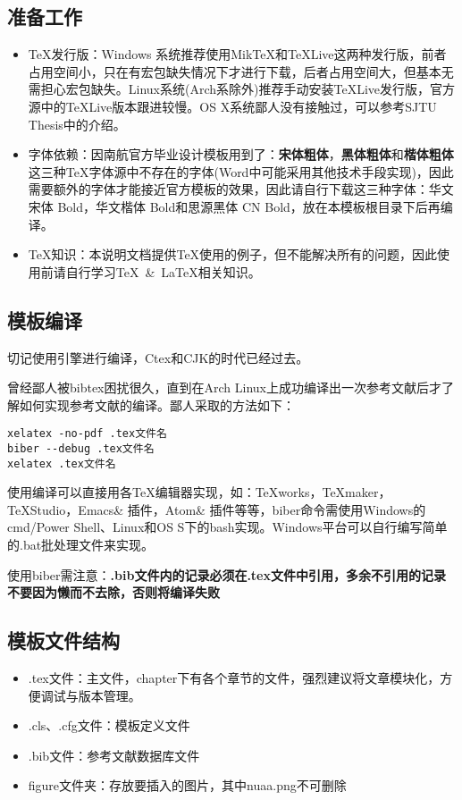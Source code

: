 \subsection{准备工作}
\begin{itemize}[noitemsep,topsep=0pt,parsep=0pt,partopsep=0pt]
  \item \TeX 发行版：Windows 系统推荐使用MikTeX和TeXLive这两种发行版，前者占用空间小，只在有宏包缺失情况下才进行下载，后者占用空间大，但基本无需担心宏包缺失。Linux系统(Arch系除外)推荐手动安装TeXLive发行版，官方源中的TeXLive版本跟进较慢。OS X系统鄙人没有接触过，可以参考SJTU Thesis中的介绍。
  \item 字体依赖：因南航官方毕业设计模板用到了：\textbf{宋体粗体}，\textbf{黑体粗体}和\textbf{楷体粗体}这三种\TeX 字体源中不存在的字体(Word中可能采用其他技术手段实现)，因此需要额外的字体才能接近官方模板的效果，因此请自行下载这三种字体：华文宋体 Bold，华文楷体 Bold和思源黑体 CN Bold，放在本模板根目录下后再编译。
  \item \TeX 知识：本说明文档提供\TeX 使用的例子，但不能解决所有的问题，因此使用前请自行学习\TeX~\&~\LaTeX 相关知识。
\end{itemize}

\subsection{模板编译}

切记使用\XeLaTeX 引擎进行编译，Ctex和CJK的时代已经过去。

曾经鄙人被bibtex困扰很久，直到在Arch Linux上成功编译出一次参考文献后才了解如何实现参考文献的编译。鄙人采取的方法如下：
\begin{lstlisting}[basicstyle=\small\ttfamily, caption={手动逐次编译}, numbers=none]
xelatex -no-pdf .tex文件名
biber --debug .tex文件名
xelatex .tex文件名
\end{lstlisting}

使用\XeLaTeX 编译可以直接用各\TeX 编辑器实现，如：TeXworks，TeXmaker，TeXStudio，Emacs\& 插件，Atom\& 插件等等，biber命令需使用Windows的cmd/Power Shell、Linux和OS S下的bash实现。Windows平台可以自行编写简单的.bat批处理文件来实现。

使用biber需注意：\textbf{.bib文件内的记录必须在.tex文件中引用，多余不引用的记录不要因为懒而不去除，否则将编译失败}

\subsection{模板文件结构}
\begin{itemize}[noitemsep,topsep=0pt,parsep=0pt,partopsep=0pt]
  \item .tex文件：主文件，chapter下有各个章节的文件，强烈建议将文章模块化，方便调试与版本管理。
  \item .cls、.cfg文件：模板定义文件
  \item .bib文件：参考文献数据库文件
  \item figure文件夹：存放要插入的图片，其中nuaa.png不可删除
\end{itemize}
